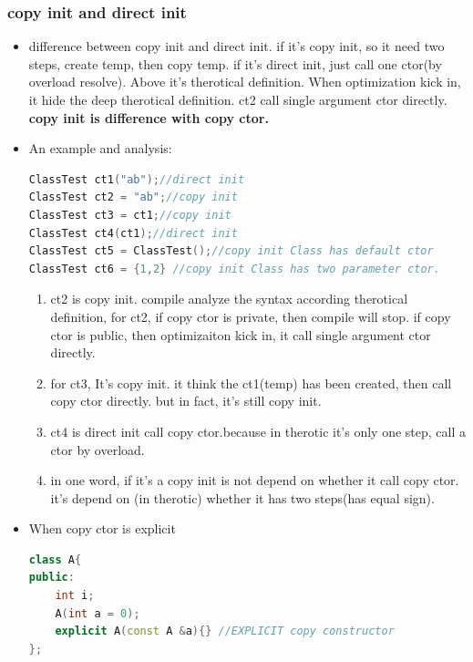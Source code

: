 \documentclass[a4paper,12pt,twoside]{book}
\begin{document}
\subsubsection{copy init and direct init}
\begin{itemize}
	\item difference between copy init and direct init. if it's copy init, so it need two steps, create temp, then copy temp.  if it's direct init, just call one ctor(by overload resolve). Above it's therotical definition. When optimization kick in, it hide the deep therotical definition.  ct2 call single argument ctor directly. \textbf{copy init is difference with copy ctor.}
	
	\item An example and analysis:

\begin{lstlisting}[frame=single, language=c++]
ClassTest ct1("ab");//direct init
ClassTest ct2 = "ab";//copy init
ClassTest ct3 = ct1;//copy init
ClassTest ct4(ct1);//direct init
ClassTest ct5 = ClassTest();//copy init Class has default ctor
ClassTest ct6 = {1,2} //copy init Class has two parameter ctor.
\end{lstlisting}

	\begin{enumerate}
		\item ct2 is copy init. compile analyze the syntax according therotical definition, for ct2, if copy ctor is private, then compile will stop. if copy ctor is public, then optimizaiton kick in, it call single argument ctor directly.
		
		\item for ct3, It's copy init. it think the ct1(temp) has been created, then call copy ctor directly. but in fact, it's still copy init.
		
		\item ct4 is direct init call copy ctor.because in therotic it's only one step, call a ctor by overload. 
		
		\item in one word, if it's a copy init is not depend on whether it call copy ctor.  it's depend on (in therotic) whether it has two steps(has equal sign).
	\end{enumerate}

	\item  When copy ctor is explicit  
\begin{lstlisting}[frame=single, language=c++]
class A{
public:
	int i;
	A(int a = 0);
	explicit A(const A &a){} //EXPLICIT copy constructor
};
	

\end{lstlisting}
\end{itemize}
\end{document}
